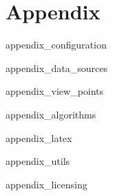 \chapter{Appendix}
\label{sec:appendix}

 {appendix_configuration}

 {appendix_data_sources}

 {appendix_view_points}

 {appendix_algorithms}

 {appendix_latex}

 {appendix_utils}

 {appendix_licensing} 
